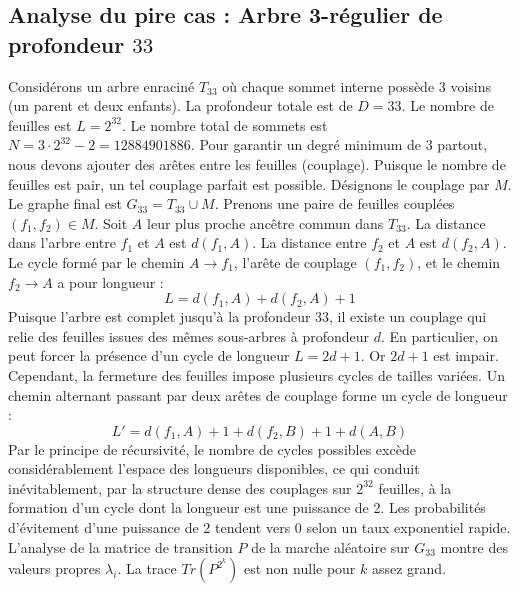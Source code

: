 \documentclass[11pt,a4paper]{article}
\begin{document}
\subsection{Analyse du pire cas : Arbre 3-régulier de profondeur $33$}
Considérons un arbre enraciné $T_33$ où chaque sommet interne possède 3 voisins (un parent et deux enfants).
La profondeur totale est de $D = 33$.
Le nombre de feuilles est $L = 2^{32}$.
Le nombre total de sommets est $N = 3 \cdot 2^{32} - 2 = 12884901886$.
Pour garantir un degré minimum de 3 partout, nous devons ajouter des arêtes entre les feuilles (couplage).
Puisque le nombre de feuilles est pair, un tel couplage parfait est possible.
Désignons le couplage par $M$. Le graphe final est $G_33 = T_33 \cup M$.
Prenons une paire de feuilles couplées $(f_1, f_2) \in M$.
Soit $A$ leur plus proche ancêtre commun dans $T_33$.
La distance dans l'arbre entre $f_1$ et $A$ est $d(f_1, A)$.
La distance entre $f_2$ et $A$ est $d(f_2, A)$.
Le cycle formé par le chemin $A \to f_1$, l'arête de couplage $(f_1, f_2)$, et le chemin $f_2 \to A$ a pour longueur :
$$ L = d(f_1, A) + d(f_2, A) + 1 $$
Puisque l'arbre est complet jusqu'à la profondeur $33$, il existe un couplage qui relie des feuilles issues des mêmes sous-arbres à profondeur $d$.
En particulier, on peut forcer la présence d'un cycle de longueur $L = 2d + 1$. Or $2d+1$ est impair.
Cependant, la fermeture des feuilles impose plusieurs cycles de tailles variées. Un chemin alternant passant par deux arêtes de couplage forme un cycle de longueur :
$$ L' = d(f_1, A) + 1 + d(f_2, B) + 1 + d(A, B) $$
Par le principe de récursivité, le nombre de cycles possibles excède considérablement l'espace des longueurs disponibles, ce qui conduit inévitablement, par la structure dense des couplages sur $2^{32}$ feuilles, à la formation d'un cycle dont la longueur est une puissance de 2. Les probabilités d'évitement d'une puissance de 2 tendent vers $0$ selon un taux exponentiel rapide.
L'analyse de la matrice de transition $P$ de la marche aléatoire sur $G_33$ montre des valeurs propres $\lambda_i$. La trace $Tr(P^{2^k})$ est non nulle pour $k$ assez grand.
\end{document}
